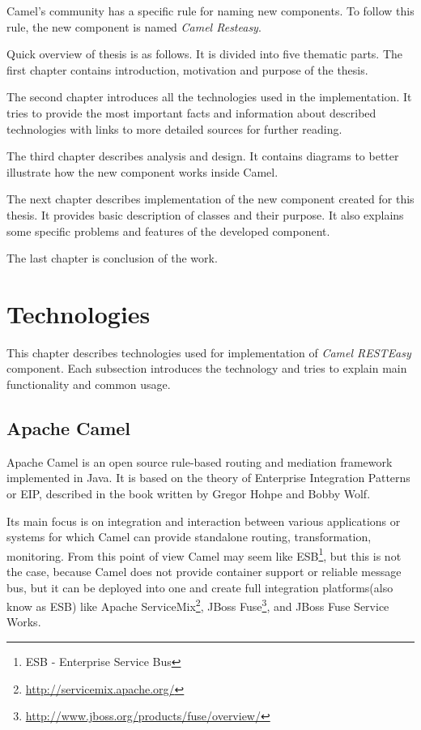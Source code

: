 \documentclass[12pt,final,oneside]{fithesis2}
\begin{document}
Camel's community has a specific rule for naming  new components. To follow this rule, the new component is named \textit{Camel Resteasy}.

Quick overview of thesis is as follows. It is divided into five thematic parts. The first chapter
contains introduction, motivation and purpose of the thesis.

The second chapter introduces all the technologies used in the implementation. It tries to provide the most important facts and information about described technologies with links to more detailed sources for further reading.

The third chapter describes analysis and design. It contains diagrams to better illustrate how the new component works inside Camel.

The next chapter describes implementation of the new component created for this thesis. It provides basic description of classes and their purpose. It also explains some specific problems and features of the developed component.

The last chapter is conclusion of the work.


\chapter{Technologies}\label{tech}
This chapter describes technologies used for implementation of \textit{Camel RESTEasy}  component. Each subsection introduces the technology and tries to explain main functionality and common usage.

\section{Apache Camel}
Apache Camel is an open source rule-based routing and mediation framework implemented in Java\cite{java-web}. It is based on the theory of Enterprise Integration Patterns or EIP, described in the book written by Gregor Hohpe and Bobby Wolf\cite{eip}.

Its main focus is on integration and interaction between various applications or systems for which Camel can provide standalone routing, transformation, monitoring. From this point of view Camel may seem like ESB\footnote{ESB - Enterprise Service Bus}, but this is not the case, because Camel does not provide container support or reliable message bus, but it can be deployed into one and create full integration platforms(also know as ESB) like Apache ServiceMix\footnote{\url{http://servicemix.apache.org/}}, JBoss Fuse\footnote{\url{http://www.jboss.org/products/fuse/overview/}}, and JBoss Fuse Service Works. 
\end{document}
